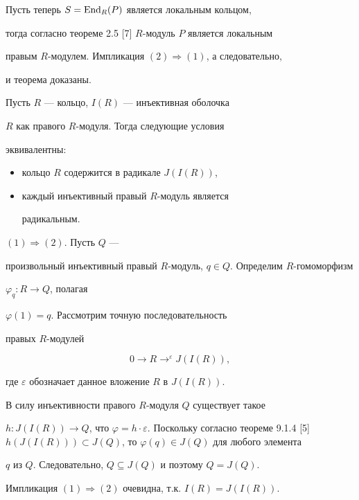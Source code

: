 Пусть теперь $S=\operatorname{End}_{R}(P)$ является локальным кольцом,


тогда согласно теореме 2.5 [7] $R$-модуль $P$ является локальным


правым $R$-модулем. Импликация $(2) \Longrightarrow (1)$, а следовательно,


и теорема доказаны.





\begin{thm} Пусть $R$ --- кольцо, $I(R)$ --- инъективная оболочка


$R$ как правого $R$-модуля. Тогда следующие условия


эквивалентны:


\begin{itemize}


\item[(1)] кольцо $R$ содержится в радикале $J(I(R))$,


\item[(2)] каждый инъективный правый $R$-модуль является


радикальным.


\end{itemize}


\end{thm}





\begin{pf} $(1) \Longrightarrow (2)$. Пусть $Q$ ---


произвольный инъективный правый $R$-модуль, $q \in


Q$. Определим $R$-гомоморфизм


$\varphi_q:R\longrightarrow Q$, полагая


$\varphi (1)=q$. Рассмотрим точную последовательность


правых $R$-модулей


$$


0 \longrightarrow R \longrightarrow^\varepsilon J(I(R)),


$$


где $\varepsilon $ обозначает данное вложение $R$ в $J(I(R))$.


В силу инъективности правого $R$-модуля $Q$ существует такое


$h:J(I(R)) \longrightarrow Q$, что $ \varphi =h \cdot


\varepsilon $. Поскольку согласно теореме 9.1.4 [5] $h(J(I(R)))


\subset J(Q) $, то $\varphi (q) \in J(Q)$ для любого элемента


$q$ из $Q$. Следовательно, $Q \subseteq J(Q)$ и поэтому $Q=J(Q)$.





Импликация $(1) \Longrightarrow (2)$ очевидна, т.к. $I(R)=J(I(R))$.


\end{pf}





